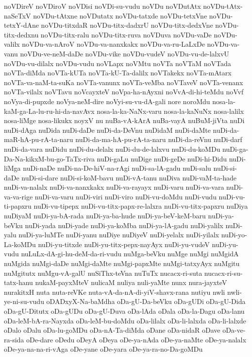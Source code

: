 {noVDireV
noVDiroV
noVDisi
noVDi-su-vudu
noVDu
noVDutAtx
noVDu-tAtx-naSeTxV
noVDu-tAtxne
noVDutatx
noVDu-tatxde
noVDu-tetxVne
noVDu-tetxY-dAne
noVDu-titxdaR
noVDu-titx-dadxrU
noVDu-titx-dedxVne
noVDu-titx-dedxnu
noVDu-titx-ralu
noVDu-titx-ruva
noVDuva
noVDu-vaDe
noVDu-valilx
noVDu-va-nAroV
noVDu-va-nanxkakx
noVDu-va-ru-LaLxDe
noVDu-va-vanu
noVDu-ve-neM-daDe
noVDu-vike
noVDu-vudeV
noVDu-vu-de-lalxvU
noVDu-vu-dilalx
noVDu-vudu
noVLapx
noVMtu
noVTa
noVTaM
noVTada
noVTa-diMda
noVTa-kUTa
noVTa-kU-Ta-dalilx
noVTakekx
noVTa-mAtarx
noVTa-va-naM-ta-suKa
noVTa-vanunx
noVTa-veMba
noVTaveV
noVTa-venanx
noVTa-vilalx
noVTavu
noVcayxteV
noVpa-ha-nAyxni
noVvA-di-hi-teMdu
noVvf
noVya-di-pupxde
noVya-neM-dire
noVyi-su-vu-dA-gali
nore
noroMdu
nosa-la-kaM-ga-La-lu-ru-hi-da-navAvx
nosa-la-ka-NaNx-varu
nosa-la-kaNuNx
nosa-lalilx
nosa-liMge
nosa-likukx
noyxV
nu
nuBa-vA-kArA
nuBa-vayA
nuBuM-jiVta
nuDi
nuDi-dAga
nuDida
nuDi-daDe
nuDi-da-DeVnu
nuDidaM
nuDi-daMte
nuDi-da-maR-hA-pu-rA-ta-naru
nuDi-da-ma-hA-pu-rA-ta-naru
nuDi-da-reVnu
nuDi-darf
nuDi-da-vara
nuDidu
nuDi-du-delalx
nuDi-du-de-lalxvu
nuDi-du-koMDu
nuDi-ga-Da-Na-kikxM-bu-go-TaTx-riva
nuDi-gaLu
nuDige
nuDi-geDe
nuDi-hi-Didu
nuDi-liMga
nuDi-naDe
nuDi-na-De-hiV-na-rAgi
nuDi-sa-lA-gadu
nuDi-salu
nuDi-si-daDe
nuDi-si-dare
nuDi-si-koM-bavu
nuDi-vA-tanu
nuDiva
nuDi-vaM-ta-hade
nuDi-va-nalalx
nuDi-va-nanxkakx
nuDi-va-rayayx
nuDi-varu
nuDi-va-vara
nuDi-va-va-rige
nuDi-va-varu
nuDi-viri
nuDi-viro
nuDi-vu-doMdu
nuDi-vudu
nuDi-vu-ti-papxru
nuDi-vu-tipepx
nuDi-vu-titx-papx-re-lalxra
nuDi-vu-titx-papxru
nuDiya
nuDiyaM
nuDi-ya-bA-rada
nuDi-ya-ba-hude
nuDi-ya-beV-keM-baru
nuDi-ya-beVku
nuDi-yada
nuDi-yade
nuDi-ya-koMba
nuDi-ya-lA-gadu
nuDi-yalilx
nuDi-yalu
nuDi-ya-luMTe
nuDi-yanu
nuDiye
nuDiyeV
nuDi-yelalx
nuDi-yilalx
nuDi-yo-La-koMDu
nuDi-yu-titxde
nuDi-yu-titx-pepx-nayAyx
nuDi-yu-vudeV
nuDi-yu-vudu
nuLuLx-dA-gi-hu-deM-da-ri-vudu
nuMga-beVku
nuMge
nuMgi
nuMgidA
nuMgida
nuMgi-daDe
nuMgi-daMte
nuMgi-papxMte
nuMgi-tatxyAyx
nuMgitu
nuMgitutx
nuMgu-vA-galU
nuSiThx-teVna
nuTuTx
nucacx-ri-suta
nucacx-ri-su-tatx-hanu
nukaM-payxMteV
nulicaM
nuliya
nuli-yaMte
nunx
nura-jayxteV
nurakitxH
nuta
nuta-reVKe
nuta-vA-da-nA-di-yiV-shavx-rana
nutiyu
nwli
nwli-ye-ni-su-vudu
oDADxyX-Na-baMdha
oDa-gU-Da-beVku
oDa-gUDi
oDa-gU-Dida
oDa-gU-Ditutx
oDa-gUDu
oDa-gU-Duva
oDa-lAda
oDala
oDa-la-Dagu
oDa-lanu
oDa-leM-bA-ra-Nayxda
oDa-leM-bu-doMdu
oDa-lilalx
oDa-li-lalxda
oDa-li-lalxde
oDalo
oDalu
oDa-lu-goMDu
oDa-nA-Ta-diMda
oDane
oDa-nidaR
oDave
oDa-ve-ra-sida
oDe-dare
oDedu
oDeyA
oDeya
oDe-ya-nAda
oDe-ya-naMte
oDe-ya-nalalx
oDe-ya-na-na-ri-vAga
oDe-yane
oDe-yara
oDe-ya-ra-no-Da-goMDu
}
